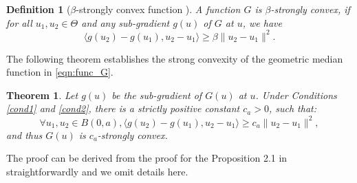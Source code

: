 \documentclass[11pt]{article}
\newtheorem{theorem}{Theorem}
\newtheorem{definition}{Definition}
\begin{document}
\begin{definition}[$ \beta $-strongly convex function \cite{nedic2003convex}]
	\label{def:strong-convex}
	A function $ G $ is $ \beta $-strongly convex, if for all $ u_1,u_2 \in \Theta $ and any sub-gradient $ g(u) $ of $ G $ at $ u $, we have
	\begin{equation*}
	\langle g(u_2)-g(u_1), u_2 - u_1 \rangle \geq \beta \|u_2-u_1\|^2.
	\end{equation*}
\end{definition}
The following theorem establishes the strong convexity of the geometric median function in \eqref{eqn:func_G}.
\begin{theorem}
	\label{theo:convexity}
	Let $ g(u) $ be the sub-gradient of $ G(u) $ at $ u $.
	Under Conditions \ref{cond1} and \ref{cond2}, there is a strictly positive constant $ c_a >0 $, such that:
	\begin{equation*}
	\forall u_1,u_2 \in {B}(0,a), \langle g(u_2)-g(u_1) , u_2-u_1\rangle  \geq c_a \|u_2-u_1\|^2,
	\end{equation*}
	and thus $ G(u) $ is $ c_a $-strongly convex.
\end{theorem}
The  proof can be derived  from the proof for the Proposition 2.1 in~\cite{cardot2013efficient} straightforwardly and we omit details here.
\end{document}
